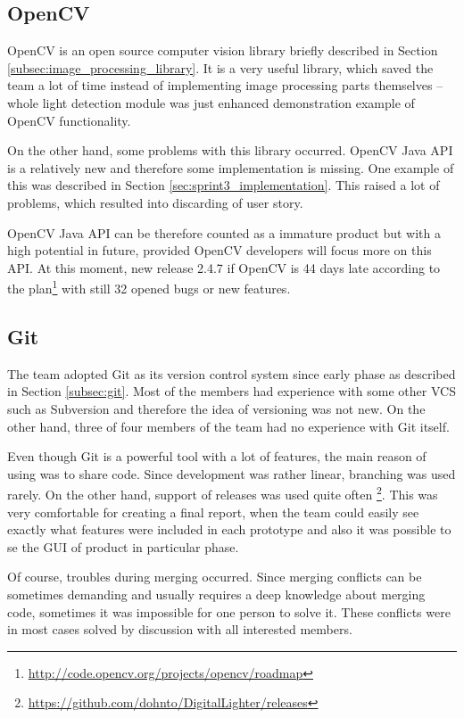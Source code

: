 \subsection{OpenCV} \label{subsec:openCV_reflection}

OpenCV is an open source computer vision library briefly described in Section \ref{subsec:image_processing_library}.
It is a very useful library, which saved the team a lot of time instead of implementing image processing parts themselves
 -- whole light detection module was just enhanced demonstration example of OpenCV functionality.

On the other hand, some problems with this library occurred.
OpenCV Java API is a relatively new and therefore some implementation is missing.
One example of this was described in Section \ref{sec:sprint3_implementation}.
This raised a lot of problems, which resulted into discarding of user story.

OpenCV Java API can be therefore counted as a immature product but with a high potential in future, provided OpenCV developers will focus more on this API.
At this moment, new release 2.4.7 if OpenCV is 44 days late according to the plan\footnote{\url{http://code.opencv.org/projects/opencv/roadmap}} with still 32 opened bugs or new features.

\subsection{Git}
The team adopted Git as its version control system since early phase as described in Section \ref{subsec:git}.
Most of the members had experience with some other VCS such as Subversion and therefore the idea of versioning was not new.
On the other hand, three of four members of the team had no experience with Git itself.

Even though Git is a powerful tool with a lot of features, the main reason of using was to share code.
Since development was rather linear, branching was used rarely.
On the other hand, support of releases was used quite often \footnote{\url{https://github.com/dohnto/DigitalLighter/releases}}.
This was very comfortable for creating a final report, when the team could easily see exactly what features were included in each prototype and also it was possible to se the GUI of product in particular phase.

Of course, troubles during merging occurred.
Since merging conflicts can be sometimes demanding and usually requires a deep knowledge about merging code, sometimes it was impossible for one person to solve it.
These conflicts were in most cases solved by discussion with all interested members.

